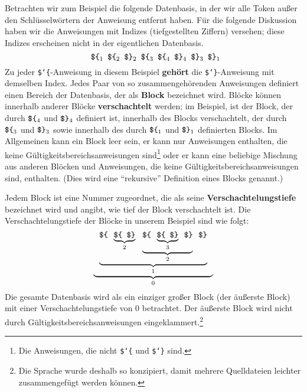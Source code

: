 Betrachten wir zum Beispiel die folgende Datenbasis, in der wir alle Token außer den Schlüsselwörtern der Anweisung entfernt haben.  Für die folgende Diskussion haben wir die Anweisungen mit Indizes (tiefgestellten Ziffern) versehen; diese Indizes erscheinen nicht in der eigentlichen Datenbasis.
\[
 \mbox{\tt \ \$\char`\{}_1
 \mbox{\tt \ \$\char`\{}_2
 \mbox{\tt \ \$\char`\}}_2
 \mbox{\tt \ \$\char`\{}_3
 \mbox{\tt \ \$\char`\{}_4
 \mbox{\tt \ \$\char`\}}_4
 \mbox{\tt \ \$\char`\}}_3
 \mbox{\tt \ \$\char`\}}_1
\]
Zu jeder \texttt{\$\char`\{}-Anweisung in diesem Beispiel {\bf gehört} die \texttt{\$\char`\}}-Anweisung mit demselben Index.  Jedes Paar von so zusammengehörenden Anweisungen definiert einen Bereich der Datenbasis, der als {\bf Block} bezeichnet wird. Blöcke können innerhalb anderer Blöcke {\bf verschachtelt} werden; im Beispiel, ist der Block, der durch $\mbox{\tt \$\char`\{}_4$ und $\mbox{\tt \$\char`\}}_4$ definiert ist, innerhalb des Blocks verschachtelt, der durch $\mbox{\tt \$\char`\{}_3$ und $\mbox{\tt \$\char`\}}_3$ sowie innerhalb des durch $\mbox{\tt \$\char`\{}_1$ und $\mbox{\tt \$\char`\}}_1$ definierten Blocks.  Im Allgemeinen kann ein Block leer sein, er kann nur Anweisungen enthalten, die keine Gültigkeitsbereichsanweisungen sind\footnote{Die Anweisungen, die nicht \texttt{\$\char`\{} und \texttt{\$\char`\}} sind.} oder er kann eine beliebige Mischung aus anderen Blöcken und Anweisungen, die keine Gültigkeitsbereichsanweisungen sind, enthalten.  (Dies wird eine "`rekursive"' Definition eines Blocks genannt.)

Jedem Block ist eine Nummer zugeordnet, die als seine {\bf Verschachtelungstiefe} bezeichnet wird und angibt, wie tief der Block verschachtelt ist. Die Verschachtelungstiefe der Blöcke in unserem Beispiel sind wie folgt:
\[
  \underbrace{
    \mbox{\tt \ }
    \underbrace{
     \mbox{\tt \$\char`\{\ }
     \underbrace{
       \mbox{\tt \$\char`\{\ }
       \mbox{\tt \$\char`\}}
     }_{2}
     \mbox{\tt \ }
     \underbrace{
       \mbox{\tt \$\char`\{\ }
       \underbrace{
         \mbox{\tt \$\char`\{\ }
         \mbox{\tt \$\char`\}}
       }_{3}
       \mbox{\tt \ \$\char`\}}
     }_{2}
     \mbox{\tt \ \$\char`\}}
   }_{1}
   \mbox{\tt \ }
 }_{0}
\]
Die gesamte Datenbasis wird als ein einziger großer Block (der äußerste Block) mit einer Verschachtelungstiefe von 0 betrachtet. Der äußerste Block wird nicht durch Gültigkeitsbereichsanweisungen eingeklammert.\footnote{Die Sprache wurde deshalb so konzipiert, damit mehrere Quelldateien leichter zusammengefügt werden können.}


